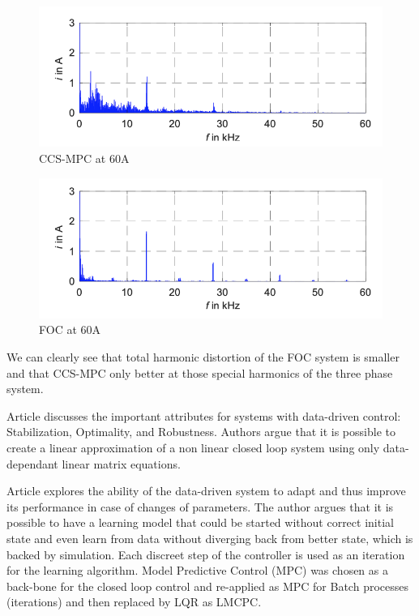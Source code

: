 \documentclass[]{final_report}
\begin{document}
\begin{figure} [h!]
\centerline{\includegraphics[width=.75\textwidth]{Screenshots for related work/Asset p1/Asset p1p3.png}}
\caption{CCS-MPC at 60A
\cite{hanke2019continuous}}
\label{fig:p1p3}
\end{figure}

\begin{figure} [h!]
\centerline{\includegraphics[width=.75\textwidth]{Screenshots for related work/Asset p1/Asset p1p4.png}}
\caption{FOC at 60A
\cite{hanke2019continuous}}
\label{fig:p1p4}
\end{figure}

We can clearly see that total harmonic distortion of the FOC system is smaller and that CCS-MPC only better at those special harmonics of the three phase system. 

Article \cite{de2019a} discusses the important attributes for systems with data-driven control: Stabilization, Optimality, and Robustness. Authors argue that it is possible to create a linear approximation of a non linear closed loop system using only data-dependant linear matrix equations. 

Article \cite{rosolia2018a} explores the ability of the data-driven system to adapt and thus improve its performance in case of changes of parameters. The author argues that it is possible to have a learning model that could be started without correct initial state and even learn from data without diverging back from better state, which is backed by simulation. Each discreet step of the controller is used as an iteration for the learning algorithm. Model Predictive Control (MPC) was chosen as a back-bone for the closed loop control and re-applied as MPC for Batch processes (iterations) and then replaced by LQR as LMCPC. 
\end{document}
